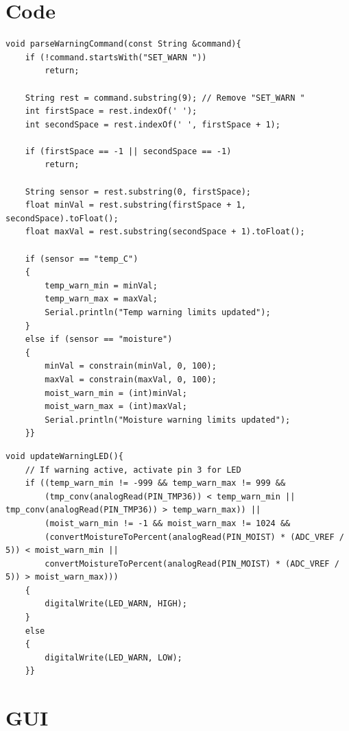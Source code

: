 \documentclass[a4paper,11pt]{article}
\begin{document}
\section{Code}

\begin{lstlisting}[style=cpp-style, 
caption={\textit{parseWarningCommand} function, 
emblematic of similar functions in \texttt{main.ino}}, label={prog:warn}]
void parseWarningCommand(const String &command){
    if (!command.startsWith("SET_WARN "))
        return;

    String rest = command.substring(9); // Remove "SET_WARN "
    int firstSpace = rest.indexOf(' ');
    int secondSpace = rest.indexOf(' ', firstSpace + 1);

    if (firstSpace == -1 || secondSpace == -1)
        return;

    String sensor = rest.substring(0, firstSpace);
    float minVal = rest.substring(firstSpace + 1, secondSpace).toFloat();
    float maxVal = rest.substring(secondSpace + 1).toFloat();

    if (sensor == "temp_C")
    {
        temp_warn_min = minVal;
        temp_warn_max = maxVal;
        Serial.println("Temp warning limits updated");
    }
    else if (sensor == "moisture")
    {
        minVal = constrain(minVal, 0, 100);
        maxVal = constrain(maxVal, 0, 100);
        moist_warn_min = (int)minVal;
        moist_warn_max = (int)maxVal;
        Serial.println("Moisture warning limits updated");
    }}
\end{lstlisting}

\begin{lstlisting}[style=cpp-style, 
caption={LED warning light}, label={prog:LED}]
void updateWarningLED(){
    // If warning active, activate pin 3 for LED
    if ((temp_warn_min != -999 && temp_warn_max != 999 &&
        (tmp_conv(analogRead(PIN_TMP36)) < temp_warn_min || tmp_conv(analogRead(PIN_TMP36)) > temp_warn_max)) ||
        (moist_warn_min != -1 && moist_warn_max != 1024 &&
        (convertMoistureToPercent(analogRead(PIN_MOIST) * (ADC_VREF / 5)) < moist_warn_min ||
        convertMoistureToPercent(analogRead(PIN_MOIST) * (ADC_VREF / 5)) > moist_warn_max)))
    {
        digitalWrite(LED_WARN, HIGH);
    }
    else
    {
        digitalWrite(LED_WARN, LOW);
    }}
\end{lstlisting}

\section{GUI}
\end{document}
